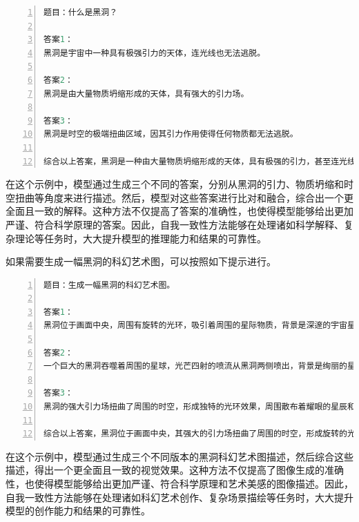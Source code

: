\begin{lstlisting}[language={python},label={},caption={}, basicstyle=\footnotesize\ttfamily, breaklines=true, numbers=left, frame=single]
题目：什么是黑洞？

答案1：
黑洞是宇宙中一种具有极强引力的天体，连光线也无法逃脱。

答案2：
黑洞是由大量物质坍缩形成的天体，具有强大的引力场。

答案3：
黑洞是时空的极端扭曲区域，因其引力作用使得任何物质都无法逃脱。

综合以上答案，黑洞是一种由大量物质坍缩形成的天体，具有极强的引力，甚至连光线也无法逃脱，从而在时空中形成极端扭曲的区域。
\end{lstlisting}

在这个示例中，模型通过生成三个不同的答案，分别从黑洞的引力、物质坍缩和时空扭曲等角度来进行描述。然后，模型对这些答案进行比对和融合，综合出一个更全面且一致的解释。这种方法不仅提高了答案的准确性，也使得模型能够给出更加严谨、符合科学原理的答案。因此，自我一致性方法能够在处理诸如科学解释、复杂理论等任务时，大大提升模型的推理能力和结果的可靠性。

如果需要生成一幅黑洞的科幻艺术图，可以按照如下提示进行。



\begin{lstlisting}[language={python},label={},caption={}, basicstyle=\footnotesize\ttfamily, breaklines=true, numbers=left, frame=single]
题目：生成一幅黑洞的科幻艺术图。

答案1：
黑洞位于画面中央，周围有旋转的光环，吸引着周围的星际物质，背景是深邃的宇宙星空。

答案2：
一个巨大的黑洞吞噬着周围的星球，光芒四射的喷流从黑洞两侧喷出，背景是绚丽的星云。

答案3：
黑洞的强大引力场扭曲了周围的时空，形成独特的光环效果，周围散布着耀眼的星辰和行星残骸。

综合以上答案，黑洞位于画面中央，其强大的引力场扭曲了周围的时空，形成旋转的光环，吸引并吞噬着周围的星际物质。两侧喷出的耀眼喷流与背景中绚丽的星云和深邃的宇宙星空相映成趣，营造出壮观而神秘的科幻艺术效果。
\end{lstlisting}

在这个示例中，模型通过生成三个不同版本的黑洞科幻艺术图描述，然后综合这些描述，得出一个更全面且一致的视觉效果。这种方法不仅提高了图像生成的准确性，也使得模型能够给出更加严谨、符合科学原理和艺术美感的图像描述。因此，自我一致性方法能够在处理诸如科幻艺术创作、复杂场景描绘等任务时，大大提升模型的创作能力和结果的可靠性。

